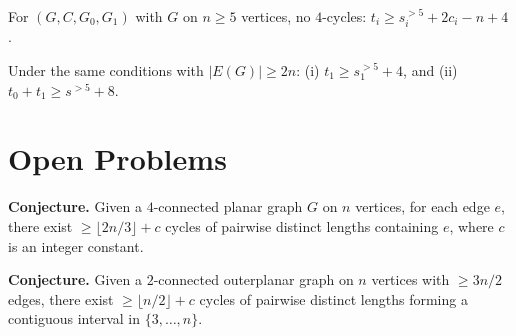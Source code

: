 \begin{lemma}
  \label{lem:leaf_triangle_bound}
  \notready
  For $(G, C, G_0, G_1)$ with $G$ on $n \ge 5$ vertices, no $4$-cycles:
  $t_i \ge s_i^{>5} + 2c_i - n + 4$.
\end{lemma}

\begin{corollary}
  \label{cor:leaf_triangle_cor}
  \notready
  Under the same conditions with $|E(G)| \ge 2n$:
  (i) $t_1 \ge s_1^{>5} + 4$, and (ii) $t_0 + t_1 \ge s^{>5} + 8$.
\end{corollary}

\chapter{Open Problems}

\begin{definition}
  \label{def:conj_edge_cycle}
  \notready
  \textbf{Conjecture.}
  Given a $4$-connected planar graph $G$ on $n$ vertices, for each edge
  $e$, there exist $\ge \lfloor 2n/3 \rfloor + c$ cycles of pairwise distinct
  lengths containing $e$, where $c$ is an integer constant.
\end{definition}

\begin{definition}
  \label{def:conj_outerplanar}
  \notready
  \textbf{Conjecture.}
  Given a $2$-connected outerplanar graph on $n$ vertices with $\ge 3n/2$
  edges, there exist $\ge \lfloor n/2 \rfloor + c$ cycles of pairwise distinct
  lengths forming a contiguous interval in $\{3, \ldots, n\}$.
\end{definition}
